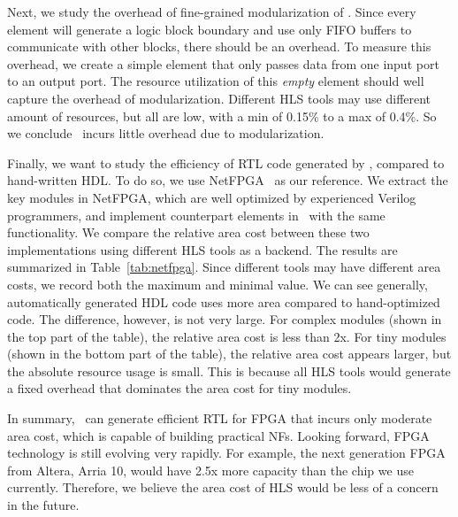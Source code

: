 Next, we study the overhead of fine-grained modularization of \name. 
Since every element will generate a logic block boundary and use only FIFO buffers to communicate with other blocks,
there should be an overhead.
To measure this overhead, we create a simple element that only passes data from one input port to an output port.
The resource utilization of this \textit{empty} element should well capture the overhead of modularization.
Different HLS tools may use different amount of resources, but all are low, with a min of 0.15\% to a max of 0.4\%.
So we conclude \name\ incurs little overhead due to modularization.

Finally, we want to study the efficiency of RTL code generated by \name, compared to hand-written HDL. 
To do so, we use NetFPGA~\cite{netfpga} as our reference.
We extract the key modules in NetFPGA, which are well optimized by experienced Verilog programmers, 
and implement counterpart elements in \name\ with the same functionality. 
We compare the relative area cost between these two implementations using different HLS tools as a backend.
The results are summarized in Table~\ref{tab:netfpga}.
Since different tools may have different area costs, we record both the maximum and minimal value.
%
We can see generally, automatically generated HDL code uses more area compared to hand-optimized code.
The difference, however, is not very large. 
For complex modules (shown in the top part of the table), the relative area cost is less than 2x.
%
For tiny modules (shown in the bottom part of the table), the relative area cost appears larger, but the absolute 
resource usage is small.
This is because all HLS tools
would generate a fixed overhead that dominates the area cost for tiny modules. 

In summary, \name\ can generate efficient RTL for FPGA that incurs only moderate area cost, 
which is capable of building practical NFs.
Looking forward, FPGA technology is still evolving very rapidly. For example, the next
generation FPGA from Altera, Arria 10, would have 2.5x more capacity than the chip we use
currently. 
Therefore, we believe the area cost of HLS would be less of a concern in the future. 

\vspace{10pt}



